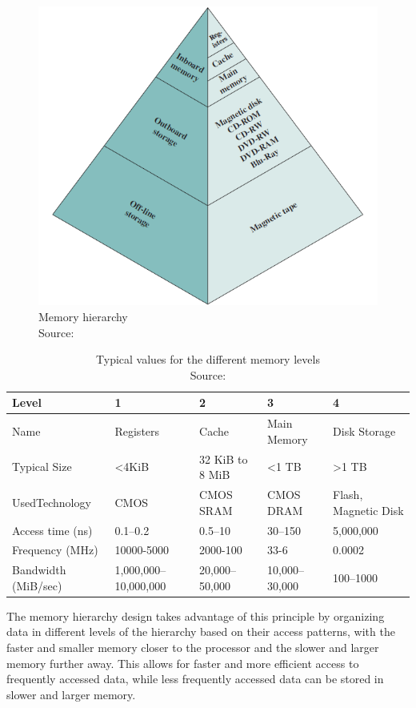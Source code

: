 \begin{figure}[H]
    \centering
    \includegraphics[width=.6\textwidth]{images/3_basics/mem-hierarch.png}
    \caption{Memory hierarchy\\Source: \cite[p. 125]{computerarch}}
    \label{fig:memhierarch}

\end{figure}


\begin{table}[H]
    \centering
    \renewcommand\tabularxcolumn[1]{m{#1}}
    \begin{tabularx}{\textwidth}{XXXXX}
    \hline
        \textbf{Level} & \textbf{1} & \textbf{2} & \textbf{3} & \textbf{4} \\ \hline
        Name & Registers & Cache & Main Memory & Disk Storage \\ \hline
        Typical Size & <4KiB & 32 KiB to 8 MiB  & <1 TB  & >1 TB \\ \hline
        Used\newline Technology & CMOS & CMOS SRAM & CMOS DRAM & Flash, Magnetic Disk \\ \hline
        Access time (ns) &  0.1–0.2  & 0.5–10  & 30–150  &  5,000,000 \\ \hline
        Frequency (MHz) & 10000-5000 & 2000-100 & 33-6 & 0.0002 \\ \hline
        Bandwidth (MiB/sec)  & 1,000,000–10,000,000  &  20,000–50,000  &  10,000–30,000  & 100–1000 \\ \hline
    \end{tabularx}
    \caption{Typical values for the different memory levels\\Source: \cite[p. 3]{quantivapproach-ApB}}
    \label{table:memhierarch}
\end{table}

The memory hierarchy design takes advantage of this principle by organizing data in different levels of the hierarchy based on their access patterns, with the faster and smaller memory closer to the processor and the slower and larger memory further away. This allows for faster and more efficient access to frequently accessed data, while less frequently accessed data can be stored in slower and larger memory. \cite[p. 127]{computerarch}

